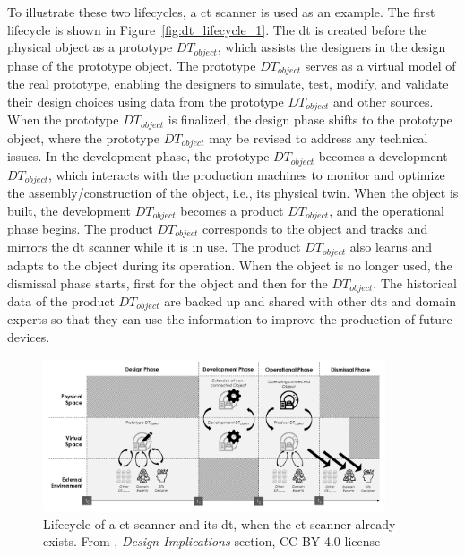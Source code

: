 To illustrate these two lifecycles, a \acrfull{ct} scanner is used as an example. The first lifecycle is shown in Figure~\ref{fig:dt_lifecycle_1}. The \acrshort{dt} is created before the physical object as a prototype $DT_{object}$, which assists the designers in the design phase of the prototype object. The prototype $DT_{object}$ serves as a virtual model of the real prototype, enabling the designers to simulate, test, modify, and validate their design choices using data from the prototype $DT_{object}$ and other sources. When the prototype $DT_{object}$ is finalized, the design phase shifts to the prototype object, where the prototype $DT_{object}$ may be revised to address any technical issues. In the development phase, the prototype $DT_{object}$ becomes a development $DT_{object}$, which interacts with the production machines to monitor and optimize the assembly/construction of the object, i.e., its physical twin. When the object is built, the development $DT_{object}$ becomes a product $DT_{object}$, and the operational phase begins. The product $DT_{object}$ corresponds to the object and tracks and mirrors the \acrshort{dt} scanner while it is in use. The product $DT_{object}$ also learns and adapts to the object during its operation. When the object is no longer used, the dismissal phase starts, first for the object and then for the $DT_{object}$. The historical data of the product $DT_{object}$ are backed up and shared with other \acrshort{dt}s and domain experts so that they can use the information to improve the production of future devices.

\begin{figure}
    \centering
    \includegraphics[width=0.9\textwidth]{images/digital_twins/dt_lifecycle_2.png}
    \caption[Lifecycle of a \acrshort{ct} scanner and its \acrshort{dt}, when the \acrshort{ct} scanner already exists]{Lifecycle of a \acrshort{ct} scanner and its \acrshort{dt}, when the \acrshort{ct} scanner already exists. From \textcite{barricelliSurveyDigitalTwin2019}, \textit{Design Implications} section, CC-BY 4.0 license}
    \label{fig:dt_lifecycle_2}
\end{figure}

